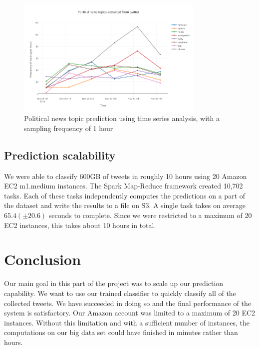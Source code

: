 \documentclass{llncs}
\begin{document}
\begin{figure}
	\centering
	\includegraphics[width=0.8\textwidth]{images/political_news_topics_extracted_from_twitter.png} 
	\caption{Political news topic prediction using time series analysis, with a sampling frequency of 1 hour}
	\label{fig:Political news topic prediction using time series analysis, with a sampling frequency of 1 hour}
\end{figure}

\subsection{Prediction scalability}

We were able to classify 600GB of tweets in roughly 10 hours using 20 Amazon EC2 m1.medium instances. The Spark Map-Reduce framework created 10,702 tasks. Each of these tasks independently computes the predictions on a part of the dataset and write the results to a file on S3. A single task takes on average $65.4 (\pm 20.6)$ seconds to complete. Since we were restricted to a maximum of 20 EC2 instances, this takes about 10 hours in total.

\section{Conclusion}
Our main goal in this part of the project was to scale up our prediction capability. We want to use our trained classifier to quickly classify all of the collected tweets. We have succeeded in doing so and the final performance of the system is satisfactory. Our Amazon account was limited to a maximum of 20 EC2 instances. Without this limitation and with a sufficient number of instances, the computations on our big data set could have finished in minutes rather than hours.



\end{document}
